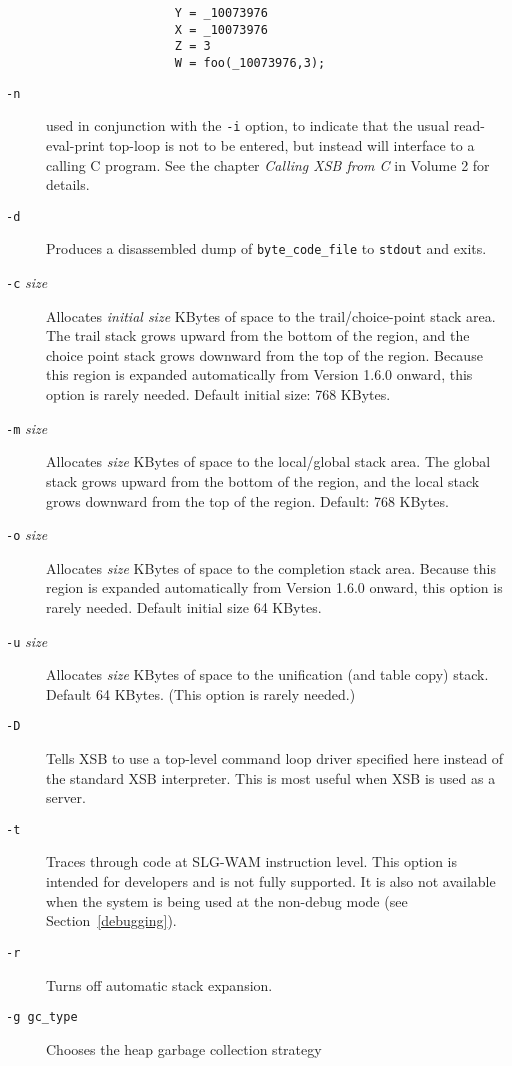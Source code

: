 \begin{description}
\begin{verbatim}
                  Y = _10073976
                  X = _10073976
                  Z = 3
                  W = foo(_10073976,3);
	\end{verbatim}
\item[{\tt -n}] used in conjunction with the {\tt -i} option, to
    indicate that the usual read-eval-print top-loop is not to be
    entered, but instead will interface to a calling C program.  See
    the chapter {\it Calling XSB from C} in Volume 2  for details.
\item[{\tt -d}] Produces a disassembled dump of {\tt byte\_code\_file} to 
    {\tt stdout} and exits.
\item[{\tt -c} {\em size}] Allocates {\em initial  size\/} KBytes of space
    to the trail/choice-point stack area.  The trail stack grows
    upward from the bottom of the region, and the choice point stack
    grows downward from the top of the region.  Because this region is
    expanded automatically from Version 1.6.0 onward, this option
    is rarely needed.  Default initial size: 768 KBytes.
\item[{\tt -m} {\em size}] Allocates {\em size\/} KBytes
    of space to the local/global stack area.  The global stack grows 
    upward from the bottom of the region, and the local stack grows 
    downward from the top of the region.  Default: 768 KBytes.
\item[{\tt -o} {\em size}] Allocates {\em size\/} KBytes of space
    to the completion stack area.  Because this region is expanded
    automatically from Version 1.6.0 onward, this option is rarely
    needed. Default initial size 64 KBytes.
\item[{\tt -u} {\em size}] Allocates {\em size} KBytes of space
    to the unification (and table copy) stack.  Default 64 KBytes.
    (This option is rarely needed.)
\item[{\tt -D}] Tells XSB to use a top-level command loop driver specified
  here instead of the standard XSB interpreter. This is most useful when
  XSB is used as a server.
\item[{\tt -t}] Traces through code at SLG-WAM instruction level.
  This option is intended for developers and is not fully supported.
  It is also not available when the system is being used at the
  non-debug mode (see Section~\ref{debugging}).
\item[{\tt -r}] Turns off automatic stack expansion.
%
\item[{\tt -g gc\_type}] Chooses the heap garbage collection strategy

\end{description}
